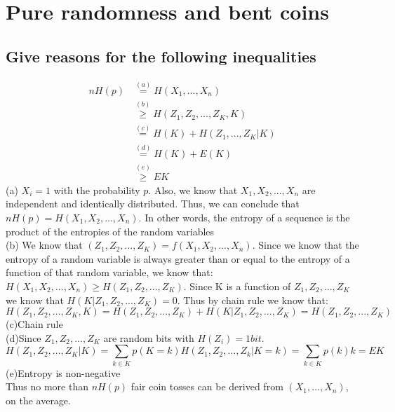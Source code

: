 \documentclass[11pt, oneside]{book}   	%
\begin{document}
\section{Pure randomness and bent coins}
\subsection{Give reasons for the following inequalities}
\begin{equation}
\begin{split}
 nH(p) & \overset{(a)}{=} H(X_1,...,X_n)\\
 & \overset{(b)}{\geq} H(Z_1, Z_2,...,Z_K,K)\\
 & \overset{(c)}{=} H(K) + H(Z_1,...,Z_K|K)\\
 & \overset{(d)}{=} H(K) + E(K)\\
 & \overset{(e)}{\geq} EK
\end{split}
\end{equation}
(a) $X_i=1$ with the probability $p$.  Also, we know that $X_1, X_2,...,X_n$ are independent and identically distributed.  Thus, we can conclude that $nH(p) = H(X_1,X_2,...,X_n)$.  In other words, the entropy of a sequence is the product of the entropies of the random variables\\
(b) We know that $(Z_1,Z_2,...,Z_K) = f(X_1, X_2,...,X_n)$.  Since we know that the entropy of a random variable is always greater than or equal to the entropy of a function of that random variable, we know that: $H(X_1,X_2,...,X_n) \geq H(Z_1,Z_2,...,Z_K)$.  Since K is a function of $Z_1,Z_2,...,Z_K$ we know that $H(K|Z_1,Z_2,...,Z_K) = 0$.  Thus by chain rule we know that:
$$H(Z_1,Z_2,...,Z_K,K) = H(Z_1,Z_2,...,Z_K) + H(K|Z_1,Z_2,...,Z_K) = H(Z_1,Z_2,...,Z_K)$$
(c)Chain rule\\
(d)Since $Z_1,Z_2,...,Z_K$ are random bits with $H(Z_i)=1bit$.
$$H(Z_1,Z_2,...,Z_K|K) = \sum_{k \in K}p(K=k)H(Z_1,Z_2,...,Z_k|K=k) = \sum_{k \in K}p(k)k = EK$$
(e)Entropy is non-negative\\
Thus no more than $nH(p)$ fair coin tosses can be derived from $(X_1,...,X_n)$, on the average.
\end{document}
